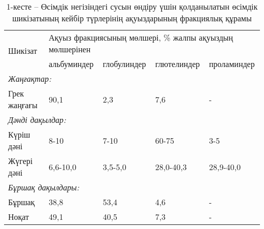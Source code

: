 \begin{table}[H]
\caption*{1-кесте -- Өсімдік негізіндегі сусын өндіру үшін қолданылатын өсімдік шикізатының кейбір түрлерінің ақуыздарының фракциялық құрамы}
\centering
\begin{tabular}{|lllll|}
\hline
\multicolumn{1}{|l|}{\multirow{2}{*}{Шикізат}} & \multicolumn{4}{l|}{Ақуыз фракциясының мөлшері, \% жалпы ақуыздың мөлшерінен} \\ \cline{2-5}
\multicolumn{1}{|l|}{} & \multicolumn{1}{l|}{альбуминдер} & \multicolumn{1}{l|}{глобулиндер} & \multicolumn{1}{l|}{глютелиндер} & проламиндер \\ \hline
\multicolumn{5}{|l|}{\textit{Жаңғақтар:}} \\ \hline
\multicolumn{1}{|l|}{Грек жаңғағы} & \multicolumn{1}{l|}{90,1} & \multicolumn{1}{l|}{2,3} & \multicolumn{1}{l|}{7,6} & - \\ \hline
\multicolumn{5}{|l|}{\textit{Дәнді дақылдар:}} \\ \hline
\multicolumn{1}{|l|}{Күріш дәні} & \multicolumn{1}{l|}{8-10} & \multicolumn{1}{l|}{7-10} & \multicolumn{1}{l|}{60-75} & 3-5 \\ \hline
\multicolumn{1}{|l|}{Жүгері дәні} & \multicolumn{1}{l|}{6,6-10,0} & \multicolumn{1}{l|}{3,5-5,0} & \multicolumn{1}{l|}{28,0-40,3} & 28,9-40,0 \\ \hline
\multicolumn{5}{|l|}{\textit{Бұршақ дақылдары:}} \\ \hline
\multicolumn{1}{|l|}{Бұршақ} & \multicolumn{1}{l|}{38,8} & \multicolumn{1}{l|}{53,4} & \multicolumn{1}{l|}{4,6} & - \\ \hline
\multicolumn{1}{|l|}{Ноқат} & \multicolumn{1}{l|}{49,1} & \multicolumn{1}{l|}{40,5} & \multicolumn{1}{l|}{7,3} & - \\ \hline
\end{tabular}
\end{table}

